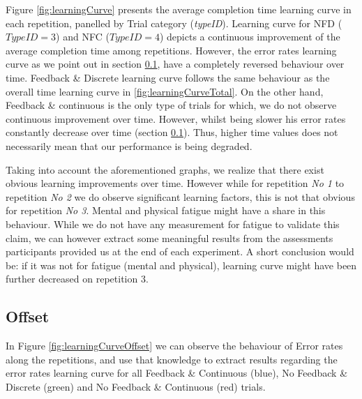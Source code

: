 Figure \ref{fig:learningCurve} presents the average completion time learning curve in each repetition, panelled by Trial category (\emph{typeID}).
Learning curve for NFD ($TypeID = 3$) and NFC ($TypeID = 4$) depicts a continuous improvement of the average completion time among repetitions. However, the error rates learning curve as we point out in section \ref{sec:LCOffset}, have a completely reversed behaviour over time. 
Feedback \& Discrete learning curve follows the same behaviour as the overall time learning curve in \ref{fig:learningCurveTotal}.
On the other hand, Feedback \& continuous is the only type of trials for which, we do not observe continuous improvement over time. However, whilst being slower his error rates constantly decrease over time (section \ref{sec:LCOffset}). Thus, higher time values does not necessarily mean that our performance is being degraded.

Taking into account the aforementioned graphs, we realize that there exist obvious learning improvements over time. However while for repetition \emph{No 1} to repetition \emph{No 2} we do observe significant learning factors, this is not that obvious for repetition \emph{No 3}. Mental and physical fatigue might have a share in this behaviour. While we do not have any measurement for fatigue to validate this claim, we can however extract some meaningful results from the assessments participants provided us at the end of each experiment. A short conclusion would be: if it was not for fatigue (mental and physical), learning curve might have been further decreased on repetition 3. 


\subsection{Offset}
\label{sec:LCOffset}
In Figure \ref{fig:learningCurveOffset} we can observe the behaviour of Error rates along the repetitions, and use that knowledge to extract results regarding the error rates learning curve for all Feedback \& Continuous (blue), No Feedback \& Discrete (green) and No Feedback \& Continuous (red) trials. 

